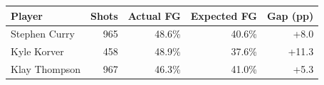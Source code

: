 \begin{tabular}{lrrrr}
\toprule
Player & Shots & Actual FG & Expected FG & Gap (pp)\\
\midrule
Stephen Curry & 965 & 48.6\% & 40.6\% & +8.0\\
Kyle Korver & 458 & 48.9\% & 37.6\% & +11.3\\
Klay Thompson & 967 & 46.3\% & 41.0\% & +5.3\\
\bottomrule
\end{tabular}
